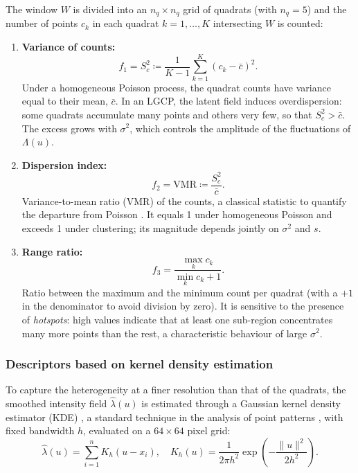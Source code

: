 \documentclass[a4paper,fleqn]{cas-sc}
\numberwithin{equation}{section}
\begin{document}
The window $W$ is divided into an $n_q\times n_q$ grid of quadrats
(with $n_q=5$) and the number of points $c_k$ in each quadrat
$k=1,\ldots,K$ intersecting $W$ is counted:

\begin{enumerate}[label=(\roman*),leftmargin=*,itemsep=0.6em]
\item \textbf{Variance of counts:}
\begin{equation}
f_1 = S_c^2 \coloneqq \frac{1}{K-1}\sum_{k=1}^{K}(c_k - \bar{c})^2.
\label{eq:f1_var_c}
\end{equation}
Under a homogeneous Poisson process, the quadrat counts have variance
equal to their mean, $\bar{c}$. In an LGCP, the latent field induces
overdispersion: some quadrats accumulate many points and others very
few, so that $S_c^2 > \bar{c}$. The excess grows with $\sigma^2$,
which controls the amplitude of the fluctuations of $\Lambda(u)$.

\item \textbf{Dispersion index:}
\begin{equation}
f_2 = \mathrm{VMR} \coloneqq \frac{S_c^2}{\bar{c}}.
\label{eq:f2_vmr}
\end{equation}
Variance-to-mean ratio (VMR) of the counts, a classical statistic to
quantify the departure from Poisson \citep{Diggle2014}. It equals 1
under homogeneous Poisson and exceeds 1 under clustering; its
magnitude depends jointly on $\sigma^2$ and $s$.

\item \textbf{Range ratio:}
\begin{equation}
f_3 = \frac{\max_k c_k}{\min_k c_k + 1}.
\label{eq:f3_range}
\end{equation}
Ratio between the maximum and the minimum count per quadrat (with a
$+1$ in the denominator to avoid division by zero). It is sensitive to
the presence of \emph{hotspots}: high values indicate that at least
one sub-region concentrates many more points than the rest, a
characteristic behaviour of large $\sigma^2$.
\end{enumerate}

\subsubsection{Descriptors based on kernel density estimation}

To capture the heterogeneity at a finer resolution than that of the
quadrats, the smoothed intensity field $\hat{\lambda}(u)$ is estimated
through a Gaussian kernel density estimator (KDE)
\citep{Silverman1986}, a standard technique in the analysis of point
patterns \citep{Illian2008, WiegandMoloney2013}, with fixed bandwidth
$h$, evaluated on a $64\times 64$ pixel grid:
\begin{equation}
    \hat{\lambda}(u) = \sum_{i=1}^{n} K_h(u - x_i), \quad
    K_h(u) = \frac{1}{2\pi h^2}\exp\!\left(-\frac{\|u\|^2}{2h^2}\right).
    \label{eq:kde}
\end{equation}
\end{document}
